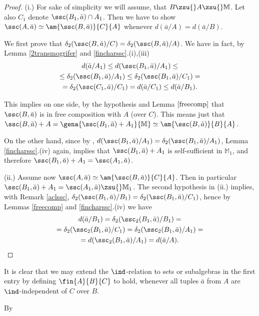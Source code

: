 \begin{proof}
(i.) For sake of simplicity we will assume,
that $B\zsu{}A\zsu{}\mathbb{M}$. Let also $C_{1}$ denote $\ssc(B_{1},\bar a)\cap A_{1}$. Then we have to show
$\ssc(A,\bar a)\simeq\am{\ssc(B,\bar a)}{C}{A}$ whenever $d(\bar a/A)=d(\bar a/B)$.

\smallskip
We first prove that $\delta_{2}(\ssc(B,\bar a)/C)=\delta_{2}(\ssc(B,\bar a)/A )$.
We have in fact, by Lemma \ref{2transmogrifer} and \ref{fincharssc}.{}(i),(iii)
\begin{multline}\label{diseq}
d(\bar a/ A_{1})
	\leq d(\ssc(B_{1},\bar a)/A_{1})\leq\\
   \leq\delta_{2}(\ssc(B_{1},\bar a)/A_{1})\leq\delta_{2}(\ssc(B_{1},\bar a)/C_{1})=\\
=\delta_{2}(\ssc(C_{1},\bar a)/C_{1})=d(\bar a/ C_{1})\leq d(\bar a/ B_{1}).
\end{multline}

This implies on one side, by the hypothesis and Lemma $\ref{freecomp}$
that $\ssc(B,\bar a)$ is in free composition with $A$ (over $C$). This means just
that $\ssc(B,\bar a)+A=\gena{\ssc(B_{1},\bar a)+A_{1}}{\mathbb{M}}\simeq \am{\ssc(B,\bar a)}{B}{A}$.

\smallskip
On the other hand, since by ,
$d(\ssc(B_{1},\bar a)/A_{1})=\delta_{2}(\ssc(B_{1},\bar a)/A_{1})$,
Lemma \ref{fincharssc}.{}(iv) again, implies that $\ssc(B_{1},\bar a)+A_{1}$ is self-sufficient in $\mathbb{M}_{1}$, and
therefore $\ssc(B_{1},\bar a)+A_{1}=\ssc(A_{1},\bar a)$.

\medskip\noindent
(ii.) Assume now $\ssc(A,\bar a)\simeq\am{\ssc(B,\bar a)}{C}{A}$.
Then in particular %
$\ssc(B_{1},\bar a)+A_{1}=\ssc(A_{1},\bar a)\zsu{}\mathbb{M}_{1}$. The second hypothesis in (ii.) implies, with Remark
\ref{aclssc}, $\delta_{2}(\ssc(B_{1},\bar a)/B_{1})=\delta_{2}(\ssc(B_{1},\bar a)/C_{1})$, hence by
Lemmas \ref{freecomp} and \ref{fincharssc}.{}(iv) we have %
\begin{multline*}
d(\bar a/B_{1})=\delta_{2}(\ssc_{2}(B_{1},\bar a)/B_{1})=\\
=\delta_{2}(\ssc_{2}(B_{1},\bar a)/C_{1})=\delta_{2}(\ssc_{2}(B_{1},\bar a)/A_{1})=\\
=d(\ssc_{2}(B_{1},\bar a)/A_{1})=d(\bar a/ A).
\end{multline*}
\end{proof}
\begin{rem}
It is clear that we may extend the $\ind$-relation to sets or subalgebras in the first entry by defining
$\fin{A}{B}{C}$ to hold, whenever all tuples $\bar a$ from $A$ are $\ind$-independent of $C$ over $B$.

By 
\end{rem}

